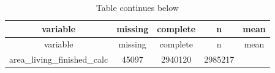 \documentclass[]{book}
\theoremstyle{definition}
\theoremstyle{definition}
\theoremstyle{definition}
\theoremstyle{remark}
\begin{document}
\begin{longtable}[]{@{}ccccc@{}}
\caption{Table continues below}\tabularnewline
\toprule
\begin{minipage}[b]{0.33\columnwidth}\centering\strut
variable\strut
\end{minipage} & \begin{minipage}[b]{0.12\columnwidth}\centering\strut
missing\strut
\end{minipage} & \begin{minipage}[b]{0.13\columnwidth}\centering\strut
complete\strut
\end{minipage} & \begin{minipage}[b]{0.12\columnwidth}\centering\strut
n\strut
\end{minipage} & \begin{minipage}[b]{0.13\columnwidth}\centering\strut
mean\strut
\end{minipage}\tabularnewline
\midrule
\endfirsthead
\toprule
\begin{minipage}[b]{0.33\columnwidth}\centering\strut
variable\strut
\end{minipage} & \begin{minipage}[b]{0.12\columnwidth}\centering\strut
missing\strut
\end{minipage} & \begin{minipage}[b]{0.13\columnwidth}\centering\strut
complete\strut
\end{minipage} & \begin{minipage}[b]{0.12\columnwidth}\centering\strut
n\strut
\end{minipage} & \begin{minipage}[b]{0.13\columnwidth}\centering\strut
mean\strut
\end{minipage}\tabularnewline
\midrule
\endhead
\begin{minipage}[t]{0.33\columnwidth}\centering\strut
area\_living\_finished\_calc\strut
\end{minipage} & \begin{minipage}[t]{0.12\columnwidth}\centering\strut
45097\strut
\end{minipage} & \begin{minipage}[t]{0.13\columnwidth}\centering\strut
2940120\strut
\end{minipage} & \begin{minipage}[t]{0.12\columnwidth}\centering\strut
2985217\strut
\end{minipage} & \begin{minipage}[t]{0.13\columnwidth}\centering\strut

\end{minipage}
\end{longtable}
\end{document}
